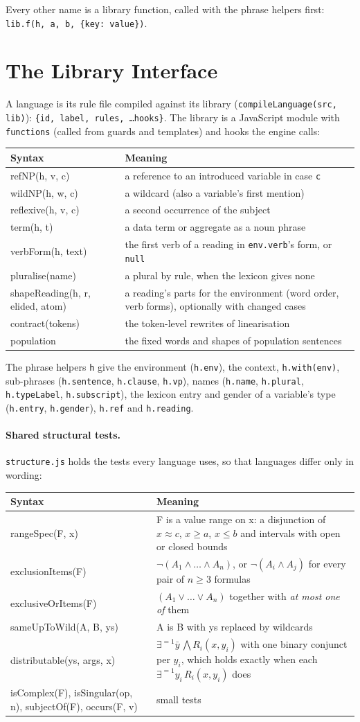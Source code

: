 \documentclass[11pt, a4paper]{article}
\newcommand{\code}[1]{\texttt{\color{codefg}#1}}
\newenvironment{predtable}{%
  \begin{center}
  \begin{tabular}{>{\leavevmode\ttfamily\color{codefg}\raggedright\arraybackslash}p{0.38\textwidth} p{0.52\textwidth}}
  \toprule
  \normalfont\textbf{Syntax} & \textbf{Meaning} \\
  \midrule
}{%
  \bottomrule
  \end{tabular}
  \end{center}
}
\newcommand{\predrow}[2]{#1 & #2 \\[3pt]}
\begin{document}
Every other name is a library function, called with the phrase helpers
first: \code{lib.f(h, a, b, \{key: value\})}.

\section{The Library Interface}
\label{sec:library-interface}

A language is its rule file compiled against its library
(\code{compileLanguage(src, lib)}): \code{\{id, label, rules, \ldots hooks\}}.
The library is a JavaScript module with \code{functions} (called from
guards and templates) and hooks the engine calls:

\begin{predtable}
  \predrow{refNP(h, v, c)}{a reference to an introduced variable in case \code{c}}
  \predrow{wildNP(h, w, c)}{a wildcard (also a variable's first mention)}
  \predrow{reflexive(h, v, c)}{a second occurrence of the subject}
  \predrow{term(h, t)}{a data term or aggregate as a noun phrase}
  \predrow{verbForm(h, text)}{the first verb of a reading in \code{env.verb}'s form, or \code{null}}
  \predrow{pluralise(name)}{a plural by rule, when the lexicon gives none}
  \predrow{shapeReading(h, r, elided, atom)}{a reading's parts for the environment (word order, verb forms), optionally with changed cases}
  \predrow{contract(tokens)}{the token-level rewrites of linearisation}
  \predrow{population}{the fixed words and shapes of population sentences}
\end{predtable}

The phrase helpers \code{h} give the environment (\code{h.env}), the context,
\code{h.with(env)}, sub-phrases (\code{h.sentence}, \code{h.clause},
\code{h.vp}), names (\code{h.name}, \code{h.plural}, \code{h.typeLabel},
\code{h.subscript}), the lexicon entry and gender of a variable's type
(\code{h.entry}, \code{h.gender}), \code{h.ref} and \code{h.reading}.

\paragraph{Shared structural tests.}
\code{structure.js} holds the tests every language uses, so that languages
differ only in wording:

\begin{predtable}
  \predrow{rangeSpec(F, x)}{F is a value range on x: a disjunction of $x \approx c$, $x \ge a$, $x \le b$ and intervals with open or closed bounds}
  \predrow{exclusionItems(F)}{$\neg(A_1 \wedge \ldots \wedge A_n)$, or $\neg(A_i \wedge A_j)$ for every pair of $n \ge 3$ formulas}
  \predrow{exclusiveOrItems(F)}{$(A_1 \vee \ldots \vee A_n)$ together with \textit{at most one of} them}
  \predrow{sameUpToWild(A, B, ys)}{A is B with ys replaced by wildcards}
  \predrow{distributable(ys, args, x)}{$\exists^{=1}\bar y\,\bigwedge R_i(x,y_i)$ with one binary conjunct per $y_i$, which holds exactly when each $\exists^{=1} y_i\,R_i(x,y_i)$ does}
  \predrow{isComplex(F), isSingular(op, n), subjectOf(F), occurs(F, v)}{small tests}
\end{predtable}
\end{document}
